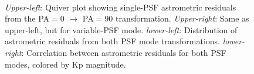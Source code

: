 \documentclass[]{spie}  %
\begin{document}
\begin{figure}[!h]
  \centering
  \\
  \hspace{-1cm}
  \caption{\textit{Upper-left}: Quiver plot showing single-PSF astrometric residuals from the PA$=$0 $\rightarrow$ PA$=$90 transformation. \textit{Upper-right}: Same as upper-left, but for variable-PSF mode. \textit{lower-left}: Distribution of astrometric residuals from both PSF mode transformations. \textit{lower-right}: Correlation between astrometric residuals for both PSF modes, colored by Kp magnitude.} \label{fig:m53_PA_compare}
\end{figure}
\end{document}
